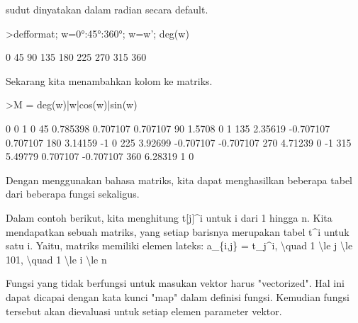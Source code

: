 \begin{eulernotebook}
\begin{eulercomment}
\begin{eulercomment}
\begin{eulercomment}
sudut dinyatakan dalam radian secara default.
\end{eulercomment}
\begin{eulerprompt}
>defformat; w=0°:45°:360°; w=w'; deg(w)
\end{eulerprompt}
\begin{euleroutput}
              0 
             45 
             90 
            135 
            180 
            225 
            270 
            315 
            360 
\end{euleroutput}
\begin{eulercomment}
Sekarang kita menambahkan kolom ke matriks.
\end{eulercomment}
\begin{eulerprompt}
>M = deg(w)|w|cos(w)|sin(w)
\end{eulerprompt}
\begin{euleroutput}
              0             0             1             0 
             45      0.785398      0.707107      0.707107 
             90        1.5708             0             1 
            135       2.35619     -0.707107      0.707107 
            180       3.14159            -1             0 
            225       3.92699     -0.707107     -0.707107 
            270       4.71239             0            -1 
            315       5.49779      0.707107     -0.707107 
            360       6.28319             1             0 
\end{euleroutput}
\begin{eulercomment}
Dengan menggunakan bahasa matriks, kita dapat menghasilkan beberapa
tabel dari beberapa fungsi sekaligus.

Dalam contoh berikut, kita menghitung t[j]\textasciicircum{}i untuk i dari 1 hingga n.
Kita mendapatkan sebuah matriks, yang setiap barisnya merupakan tabel
t\textasciicircum{}i untuk satu i. Yaitu, matriks memiliki elemen lateks: a\_\{i,j\} =
t\_j\textasciicircum{}i, \textbackslash{}quad 1 \textbackslash{}le j \textbackslash{}le 101, \textbackslash{}quad 1 \textbackslash{}le i \textbackslash{}le n

Fungsi yang tidak berfungsi untuk masukan vektor harus "vectorized".
Hal ini dapat dicapai dengan kata kunci "map" dalam definisi fungsi.
Kemudian fungsi tersebut akan dievaluasi untuk setiap elemen parameter
vektor.


\end{eulercomment}
\end{eulercomment}
\end{eulercomment}
\end{eulernotebook}
